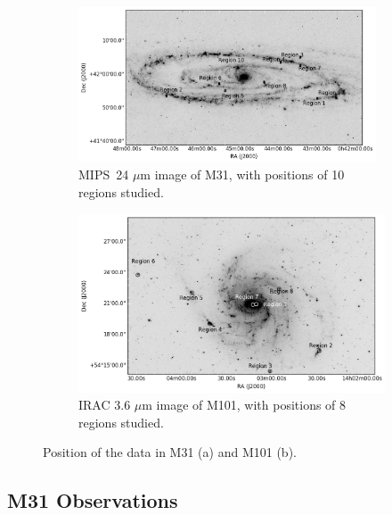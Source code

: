     \begin{figure}
  \begin{subfigure}[b]{\textwidth}
        \centering
        \includegraphics[width=0.97\textwidth]{../image_paper3/images0.01/M31/M31.png}
        \caption{MIPS~24 $\mu$m image of M31, with positions of 10 regions studied.}
        \label{fig: regions in m31}
    \end{subfigure}
    \hfill
    \begin{subfigure}[b]{\textwidth}
        \includegraphics[width=\textwidth]{../image_paper3/images0.01/M101/M101.png}
        \caption{IRAC 3.6 $\mu$m image of M101, with positions of  8 regions studied.}
    \label{fig: regions in m101}
    \end{subfigure}
    \caption[Position of the data in M31 and M101]{Position of the data in M31 (a) and M101 (b).}
\end{figure}

    \subsection{M31 Observations}
     \label{Sec: data_M31_SOMN} 
     
